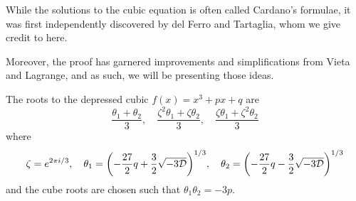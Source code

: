 \begin{remark}
    While the solutions to the cubic equation is often called Cardano's formulae,
    it was first independently discovered by del Ferro and Tartaglia,
    whom we give credit to here.

    Moreover, the proof has garnered improvements and simplifications from Vieta and Lagrange,
    and as such, we will be presenting those ideas.
\end{remark}
\begin{theorem}
    The roots to the depressed cubic \(f(x) = x^3 + px + q\) are
    \begin{equation*}
        \frac{\theta_1+\theta_2}{3},\quad
        \frac{\zeta^2\theta_1 + \zeta\theta_2}{3},\quad
        \frac{\zeta\theta_1 + \zeta^2\theta_2}{3}
    \end{equation*}
    where
    \begin{equation*}
        \zeta = e^{2\pi i/3}, \quad
        \theta_1 = \pqty{-\frac{27}{2}q + \frac{3}{2}\sqrt{-3\mca{D}}}^{1/3}, \quad
        \theta_2 = \pqty{-\frac{27}{2}q - \frac{3}{2}\sqrt{-3\mca{D}}}^{1/3}
    \end{equation*}
    and the cube roots are chosen such that \(\theta_1\theta_2 = -3p\).
\end{theorem}
